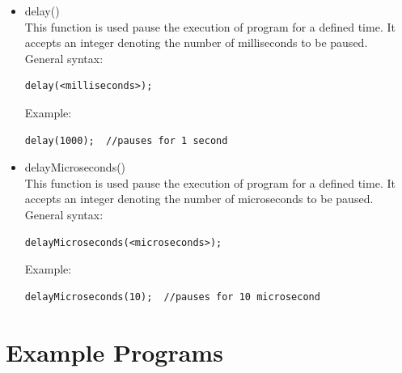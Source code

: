 \begin{itemize}
    \item delay()\\
    This function is used pause the execution of program for a defined time. It accepts an integer denoting the number of milliseconds to be paused.\\
    General syntax:
     \begin{lstlisting}[style=CStyle]
        delay(<milliseconds>);
    \end{lstlisting}
    Example:
     \begin{lstlisting}[style=CStyle]
        delay(1000);  //pauses for 1 second
    \end{lstlisting}
        
    \item delayMicroseconds()\\
    This function is used pause the execution of program for a defined time. It accepts an integer denoting the number of microseconds to be paused.\\
    General syntax:
    \begin{lstlisting}[style=CStyle]
        delayMicroseconds(<microseconds>);
    \end{lstlisting}
    Example:
     \begin{lstlisting}[style=CStyle]
        delayMicroseconds(10);  //pauses for 10 microsecond
    \end{lstlisting}
\end{itemize}

\newpage
\section{Example Programs}
